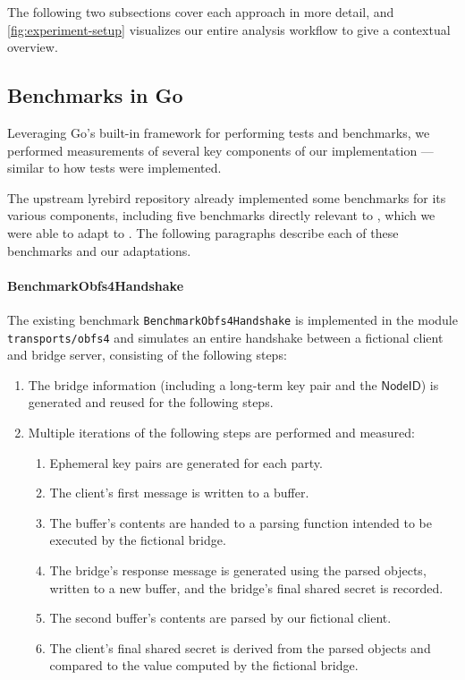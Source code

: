 The following two subsections cover each approach in more detail, and \cref{fig:experiment-setup} visualizes our entire analysis workflow to give a contextual overview.

\subsection{Benchmarks in Go}

Leveraging Go's built-in framework for performing tests and benchmarks, we performed measurements of several key components of our implementation --- similar to how tests were implemented.

The upstream lyrebird repository already implemented some benchmarks for its various components, including five benchmarks directly relevant to \obfsfour{}, which we were able to adapt to \drivel{}. The following paragraphs describe each of these benchmarks and our adaptations.

\paragraph{BenchmarkObfs4Handshake}
The existing benchmark \texttt{BenchmarkObfs4Handshake} is implemented in the module \texttt{transports/obfs4} and simulates an entire \obfsfour{} handshake between a fictional client and bridge server, consisting of the following steps:
\begin{enumerate}
    \item The bridge information (including a long-term key pair and the $\mathsf{NodeID}$) is generated and reused for the following steps.\label{enum:setup}
    \item Multiple iterations of the following steps are performed and measured:
    \begin{enumerate}
        \item Ephemeral key pairs are generated for each party.
        \item The client's first message is written to a buffer.
        \item The buffer's contents are handed to a parsing function intended to be executed by the fictional bridge.
        \item The bridge's response message is generated using the parsed objects, written to a new buffer, and the bridge's final shared secret is recorded.
        \item The second buffer's contents are parsed by our fictional client.
        \item The client's final shared secret is derived from the parsed objects and compared to the value computed by the fictional bridge.
    \end{enumerate}
\end{enumerate}

